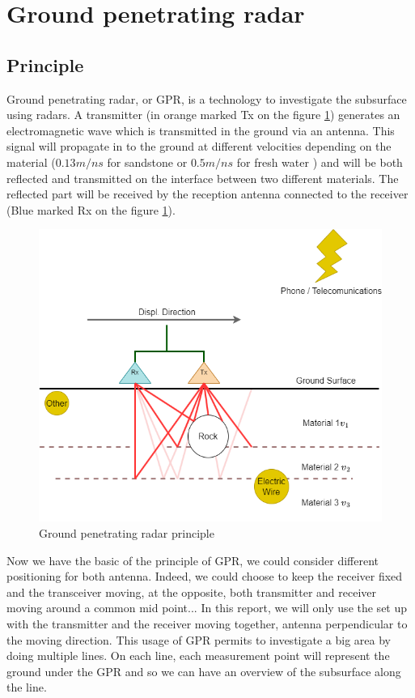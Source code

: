 \newpage
\section{Ground penetrating radar}

\subsection{Principle}

Ground penetrating radar, or GPR, is a technology to investigate the subsurface using radars. A transmitter (in orange marked Tx on the figure \ref{fig:GPR}) generates an electromagnetic wave which is transmitted in the ground via an antenna. This signal will propagate in to the ground at different velocities depending on the material ($0.13 m/ns$ for sandstone or $0.5 m/ns$ for fresh water \cite{GPRAnalysis}) and will be both reflected and transmitted on the interface between two different materials. The reflected part will be received by the reception antenna connected to the receiver (Blue marked Rx on the figure \ref{fig:GPR}).

\begin{figure}[h]
    \centering
    \includegraphics[width=0.8\linewidth]{Images/00_Theory/GPR Diagramm.drawio.png}
    \caption{Ground penetrating radar principle}
    \label{fig:GPR}
\end{figure}

Now we have the basic of the principle of GPR, we could consider different positioning for both antenna. Indeed, we could choose to keep the receiver fixed and the transceiver moving, at the opposite, both transmitter and receiver moving around a common mid point... In this report, we will only use the set up with the transmitter and the receiver moving together, antenna perpendicular to the moving direction.
This usage of GPR permits to investigate a big area by doing multiple lines. On each line, each measurement point will represent the ground under the GPR and so we can have an overview of the subsurface along the line. \cite{Rnning2023GroundPerformance}

